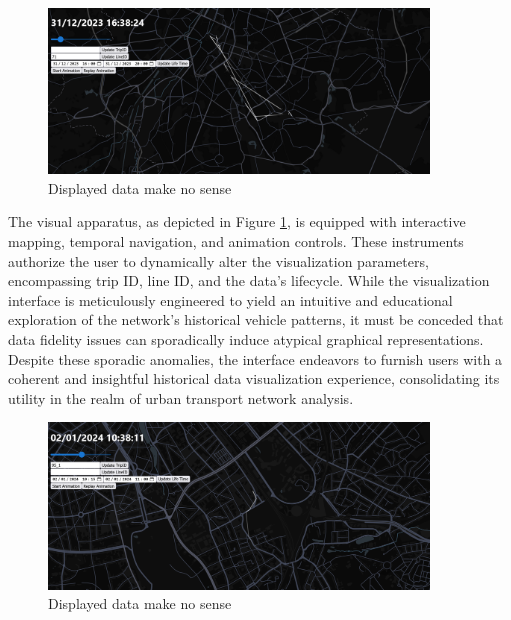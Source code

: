 \documentclass[12pt]{report}
\begin{document}
	\begin{center}
		\begin{figure}
			\centering
			\includegraphics[width=0.9\textwidth]{images/BadDataHist.png}
			\caption{Displayed data make no sense}
			\label{badDataHist}
		\end{figure}
	\end{center}
	\vspace{-2cm}
	The visual apparatus, as depicted in Figure \ref{badDataHist}, is equipped with interactive mapping, temporal navigation, and animation controls. These instruments authorize the user to dynamically alter the visualization parameters, encompassing trip ID, line ID, and the data's lifecycle. While the visualization interface is meticulously engineered to yield an intuitive and educational exploration of the network's historical vehicle patterns, it must be conceded that data fidelity issues can sporadically induce atypical graphical representations. Despite these sporadic anomalies, the interface endeavors to furnish users with a coherent and insightful historical data visualization experience, consolidating its utility in the realm of urban transport network analysis.
	
	\begin{center}
		\begin{figure}
			\centering
			\includegraphics[width=0.9\textwidth]{images/GoodVisu.png}
			\caption{Displayed data make no sense}
			\label{GoodVisu}
		\end{figure}
	\end{center}
	
\end{document}
